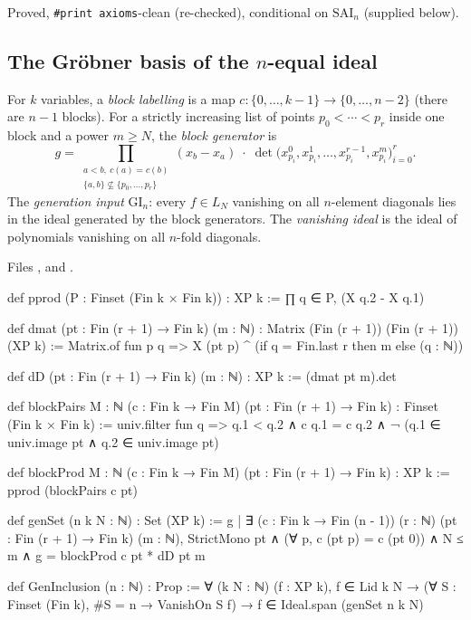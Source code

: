 \begin{status}
Proved, \texttt{\#print axioms}-clean (re-checked), conditional on $\mathrm{SAI}_n$ (supplied below).
\end{status}

\subsection{The Gr\"obner basis of the \texorpdfstring{$n$}{n}-equal ideal}

\begin{definition}\label{l29:def:geninclusion}
For $k$ variables, a \emph{block labelling} is a map $c:\{0,\dots,k-1\}\to\{0,\dots,n-2\}$ (there are $n-1$ blocks). For
a strictly increasing list of points $p_0<\cdots<p_r$ inside one block and a power $m\ge N$, the \emph{block generator}
is
\begin{equation*}
g=\prod_{\substack{a<b,\ c(a)=c(b)\\ \{a,b\}\not\subseteq\{p_0,\dots,p_r\}}}(x_b-x_a)\;\cdot\;
\det\bigl(x_{p_i}^{0},x_{p_i}^{1},\dots,x_{p_i}^{r-1},x_{p_i}^{m}\bigr)_{i=0}^{r}.
\end{equation*}
The \emph{generation input} $\mathrm{GI}_n$: every $f\in L_N$ vanishing on all $n$-element diagonals lies in the ideal
generated by the block generators. The \emph{vanishing ideal} is the ideal of polynomials vanishing on all $n$-fold
diagonals.
\end{definition}

\noindent Files ,
 and
.
\begin{leancode}
def pprod (P : Finset (Fin k × Fin k)) : XP k := ∏ q ∈ P, (X q.2 - X q.1)

def dmat (pt : Fin (r + 1) → Fin k) (m : ℕ) : Matrix (Fin (r + 1)) (Fin (r + 1)) (XP k) :=
  Matrix.of fun p q => X (pt p) ^ (if q = Fin.last r then m else (q : ℕ))

def dD (pt : Fin (r + 1) → Fin k) (m : ℕ) : XP k := (dmat pt m).det

def blockPairs {M : ℕ} (c : Fin k → Fin M) (pt : Fin (r + 1) → Fin k) : Finset (Fin k × Fin k) :=
  univ.filter fun q => q.1 < q.2 ∧ c q.1 = c q.2 ∧ ¬ (q.1 ∈ univ.image pt ∧ q.2 ∈ univ.image pt)

def blockProd {M : ℕ} (c : Fin k → Fin M) (pt : Fin (r + 1) → Fin k) : XP k :=
  pprod (blockPairs c pt)

def genSet (n k N : ℕ) : Set (XP k) :=
  {g | ∃ (c : Fin k → Fin (n - 1)) (r : ℕ) (pt : Fin (r + 1) → Fin k) (m : ℕ),
    StrictMono pt ∧ (∀ p, c (pt p) = c (pt 0)) ∧ N ≤ m ∧ g = blockProd c pt * dD pt m}

def GenInclusion (n : ℕ) : Prop :=
  ∀ (k N : ℕ) (f : XP k), f ∈ Lid k N → (∀ S : Finset (Fin k), #S = n → VanishOn S f) →
    f ∈ Ideal.span (genSet n k N)
\end{leancode}

